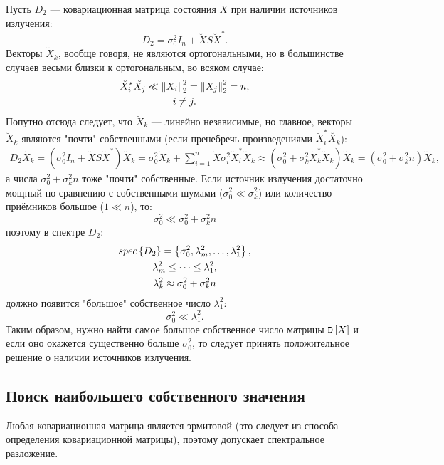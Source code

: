 Пусть $D_2$ --- ковариационная матрица состояния $X$ при наличии источников излучения:
\[
    D_2 = \sigma_0^2 I_n + \breve{X} S \breve{X}^* .
\]
Векторы $\breve{X}_k$, вообще говоря, не являются ортогональными, но в большинстве случаев весьми близки к ортогональным, во всяком случае:
\begin{gather*}
    \breve{X}_i^* \breve{X_j} \ll \left \| X_i \right \|_{2}^2 = \left \| X_j \right \|_{2}^2 = n , \\
    i \neq j .
\end{gather*}
Попутно отсюда следует, что $\breve{X}_k$ --- линейно независимые, но главное, векторы $\breve{X}_k$ являются "почти"{} собственными (если пренебречь произведениями
$\breve{X}_i^* \breve{X_k}$):
\begin{gather*}
    D_2 \breve{X}_k
    = \left ( \sigma_0^2 I_n + \breve{X} S \breve{X}^* \right ) \breve{X}_k
    = \sigma_0^2 \breve{X}_k + \sum_{i=1}^n \breve{X} \sigma_i^2 \breve{X}_i^* \breve{X}_k
    \approx ( \sigma_0^2 + \sigma_k^2 \breve{X}_k^* \breve{X}_k ) \breve{X}_k
    = ( \sigma_0^2 + \sigma_k^2 n ) \breve{X}_k ,
\end{gather*}
а числа $\sigma_0^2 + \sigma_k^2 n$ тоже "почти"{} собственные. Если источник излучения достаточно мощный по сравнению с собственными шумами ($\sigma_0^2 \ll \sigma_k^2$)
или количество приёмников большое ($1 \ll n$), то:
\[
    \sigma_0^2 \ll \sigma_0^2 + \sigma_k^2 n
\]
поэтому в спектре $D_2$:
\begin{gather}
    spec \left \{ D_2 \right \} = \left \{ \sigma_0^2, \lambda_m^2, \dots, \lambda_1^2 \right \} , \notag \\
    \lambda_m^2 \le \dots \le \lambda_1^2 , \notag \\
    \lambda_k^2 \approx \sigma_0^2 + \sigma_k^2 n \label{eigenvalues}
\end{gather}
должно появится "большое"{} собственное число $\lambda_1^2$:
\[
    \sigma_0^2 \ll \lambda_1^2 .
\]
Таким образом, нужно найти самое большое собственное число матрицы $\mathtt{D} \left[ X \right]$ и если оно окажется существенно больше $\sigma_0^2$, то следует принять положительное
решение о наличии источников излучения.

\subsection{Поиск наибольшего собственного значения}

Любая ковариационная матрица является эрмитовой (это следует из способа определения ковариационной матрицы), поэтому допускает спектральное разложение.

